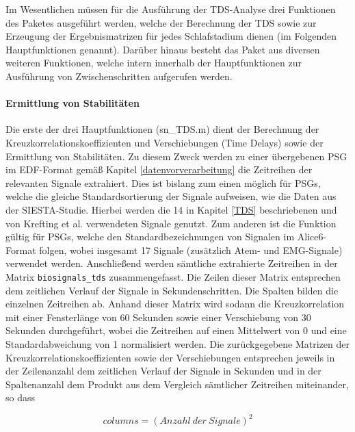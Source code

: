 Im Wesentlichen müssen für die Ausführung der \acs{TDS}-Analyse drei Funktionen des Paketes ausgeführt werden, welche der Berechnung der \acs{TDS} sowie zur Erzeugung der Ergebnismatrizen für jedes Schlafstadium dienen (im Folgenden Hauptfunktionen genannt). Darüber hinaus besteht das Paket aus diversen weiteren Funktionen, welche intern innerhalb der Hauptfunktionen zur Ausführung von Zwischenschritten aufgerufen werden.\\

\paragraph{Ermittlung von Stabilitäten} Die erste der drei Hauptfunktionen (sn\_TDS.m) dient der Berechnung der Kreuzkorrelationskoeffizienten und Verschiebungen (Time Delays) sowie der Ermittlung von Stabilitäten. Zu diesem Zweck werden zu einer übergebenen \acs{PSG} im \acs{EDF}-Format gemäß Kapitel \ref{datenvorverarbeitung} die Zeitreihen der relevanten Signale extrahiert. Dies ist bislang zum einen möglich für \acs{PSG}s, welche die gleiche Standardsortierung der Signale aufweisen, wie die Daten aus der SIESTA-Studie. Hierbei werden die 14 in Kapitel \ref{TDS} beschriebenen und von Krefting et al. verwendeten Signale genutzt. Zum anderen ist die Funktion gültig für \acs{PSG}s, welche den Standardbezeichnungen von Signalen im Alice6-Format folgen, wobei insgesamt 17 Signale (zusätzlich Atem- und \acs{EMG}-Signale) verwendet werden. Anschließend werden sämtliche extrahierte Zeitreihen in der Matrix \texttt{biosignals\_tds} zusammengefasst. Die Zeilen dieser Matrix entsprechen dem zeitlichen Verlauf der Signale in Sekundenschritten. Die Spalten bilden die einzelnen Zeitreihen ab. Anhand dieser Matrix wird sodann die Kreuzkorrelation mit einer Fensterlänge von 60 Sekunden sowie einer Verschiebung von 30 Sekunden durchgeführt, wobei die Zeitreihen auf einen Mittelwert von 0 und eine Standardabweichung von 1 normalisiert werden. Die zurückgegebene Matrizen der Kreuzkorrelationskoeffizienten sowie der Verschiebungen entsprechen jeweils in der Zeilenanzahl dem zeitlichen Verlauf der Signale in Sekunden und in der Spaltenanzahl dem Produkt aus dem Vergleich sämtlicher Zeitreihen miteinander, so dass 

\begin{equation}
columns = (Anzahl~der~Signale)^2
	\label{eq:columns}
\end{equation}

